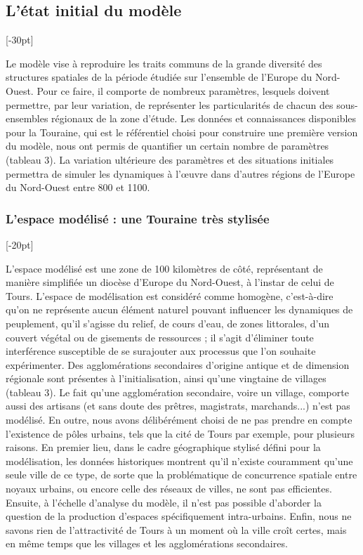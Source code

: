 \documentclass[12pt, a4paper, oneside]{book}
\begin{document}
	\subsection{L'état initial du modèle}[-30pt]
	
	Le modèle vise à reproduire les traits communs de la grande diversité des structures spatiales de la période étudiée sur l'ensemble de l'Europe du Nord-Ouest.
	Pour ce faire, il comporte de nombreux paramètres, lesquels doivent permettre, par leur variation, de représenter les particularités de chacun des sous-ensembles régionaux de la zone d'étude.
	Les données et connaissances disponibles pour la Touraine, qui est le référentiel choisi pour construire une première version du modèle, nous ont permis de quantifier un certain nombre de paramètres (tableau 3).
	La variation ultérieure des paramètres et des situations initiales permettra de simuler les dynamiques à l'œuvre dans d'autres régions de l'Europe du Nord-Ouest entre 800 et 1100.
	
	\subsubsection{L'espace modélisé : une Touraine très stylisée}[-20pt]
	
	L'espace modélisé est une zone de 100 kilomètres de côté, représentant de manière simplifiée un diocèse d'Europe du Nord-Ouest, à l'instar de celui de Tours.
	L'espace de modélisation est considéré comme homogène, c'est-à-dire qu'on ne représente aucun élément naturel pouvant influencer les dynamiques de peuplement, qu'il s'agisse du relief, de cours d'eau, de zones littorales, d'un couvert végétal ou de gisements de ressources ;
	il s'agit d'éliminer toute interférence susceptible de se surajouter aux processus que l'on souhaite expérimenter.
	Des agglomérations secondaires d'origine antique et de dimension régionale sont présentes à l'initialisation, ainsi qu'une vingtaine de villages (tableau 3).
	Le fait qu'une agglomération secondaire, voire un village, comporte aussi des artisans (et sans doute des prêtres, magistrats, marchands...) n'est pas modélisé.
	En outre, nous avons délibérément choisi de ne pas prendre en compte l'existence de pôles urbains, tels que la cité de Tours par exemple, pour plusieurs raisons.
	En premier lieu, dans le cadre géographique stylisé défini pour la modélisation, les données historiques montrent qu'il n'existe couramment qu'une seule ville de ce type, de sorte que la problématique de concurrence spatiale entre noyaux urbains, ou encore celle des réseaux de villes, ne sont pas efficientes.
	Ensuite, à l'échelle d'analyse du modèle, il n'est pas possible d'aborder la question de la production d'espaces spécifiquement intra-urbains.
	Enfin, nous ne savons rien de l'attractivité de Tours à un moment où la ville croît certes, mais en même temps que les villages et les agglomérations secondaires.
	
\end{document}
